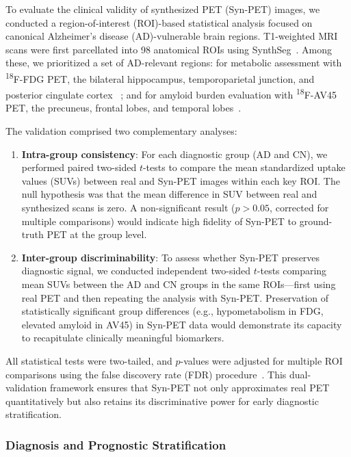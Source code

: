 \documentclass[a4paper]{cas-sc}
\begin{document}
To evaluate the clinical validity of synthesized PET (Syn-PET) images, we conducted a region-of-interest (ROI)-based statistical analysis focused on canonical Alzheimer’s disease (AD)-vulnerable brain regions. T1-weighted MRI scans were first parcellated into 98 anatomical ROIs using SynthSeg~\citep{synthseg}. Among these, we prioritized a set of AD-relevant regions: for metabolic assessment with \textsuperscript{18}F-FDG PET, the bilateral hippocampus, temporoparietal junction, and posterior cingulate cortex ~\citep{mueller2005alzheimers}; and for amyloid burden evaluation with \textsuperscript{18}F-AV45 PET, the precuneus, frontal lobes, and temporal lobes~\citep{wong2010in}.

The validation comprised two complementary analyses:

\begin{enumerate}
    \item \textbf{Intra-group consistency}: For each diagnostic group (AD and CN), we performed paired two-sided $t$-tests to compare the mean standardized uptake values (SUVs) between real and Syn-PET images within each key ROI. The null hypothesis was that the mean difference in SUV between real and synthesized scans is zero. A non-significant result ($p > 0.05$, corrected for multiple comparisons) would indicate high fidelity of Syn-PET to ground-truth PET at the group level.

    \item \textbf{Inter-group discriminability}: To assess whether Syn-PET preserves diagnostic signal, we conducted independent two-sided $t$-tests comparing mean SUVs between the AD and CN groups in the same ROIs—first using real PET and then repeating the analysis with Syn-PET. Preservation of statistically significant group differences (e.g., hypometabolism in FDG, elevated amyloid in AV45) in Syn-PET data would demonstrate its capacity to recapitulate clinically meaningful biomarkers.
\end{enumerate}

All statistical tests were two-tailed, and $p$-values were adjusted for multiple ROI comparisons using the false discovery rate (FDR) procedure~\citep{benjamini1995controlling}. This dual-validation framework ensures that Syn-PET not only approximates real PET quantitatively but also retains its discriminative power for early diagnostic stratification.

\subsubsection{Diagnosis and Prognostic Stratification}
\end{document}
